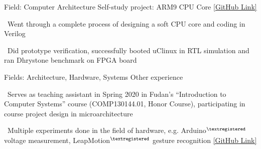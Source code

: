 

\begin{cventries}

  \cventry
    {Field: Computer Architecture} %
    {{Self-study project: ARM9 CPU Core}  \href{https://github.com/jasha64/ARM9-compatible-soft-CPU-core}{[GitHub Link]}} %
    {} %
    {} %
    {
      \begin{cvitems} %
        \item {\quad\bullet\ }{Went through a complete process of designing a soft CPU core and coding in Verilog}
        \item {\quad\bullet\ }{Did prototype verification, successfully booted uClinux in RTL simulation and ran Dhrystone benchmark on FPGA board}
      \end{cvitems}
    }

  \cventry
    {Fields: Architecture, Hardware, Systems} %
    {Other experience} %
    {} %
    {} %
    {
      \begin{cvitems}
        \item {\bullet\ }{Serves as teaching assistant in Spring 2020 in Fudan’s ``Introduction to Computer Systems'' course (COMP130144.01, Honor Course), participating in course project design in microarchitecture}
        \item {\bullet\ }{Multiple experiments done in the field of hardware, e.g. Arduino$^{\textregistered}$ voltage measurement, LeapMotion$^{\textregistered}$ gesture recognition  \href{https://github.com/jasha64/jasha64/tree/master/Fall\%202019/Hardware\%20Experiments}{[GitHub Link]}}
      \end{cvitems}
    }

\end{cventries}
